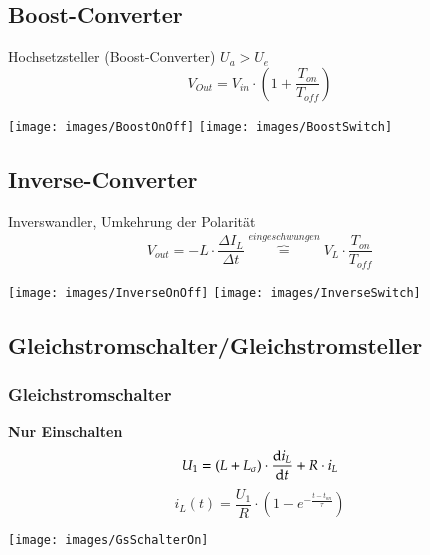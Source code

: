 \subsection{Boost-Converter}
\begin{minipage}{0.75\linewidth}
    Hochsetzsteller (Boost-Converter) $U_a > U_e  $\newline
    \[ V_{Out}=V_{in}\cdot \left(1+\frac{T_{on}}{T_{off}} \right)\]
    
\end{minipage}
\begin{minipage}{0.25\linewidth}
    \vspace{-3cm}
    \texttt{[image: images/BoostOnOff]}
    \texttt{[image: images/BoostSwitch]}
\end{minipage}

\subsection{Inverse-Converter}
\begin{minipage}{0.75\linewidth}
Inverswandler, Umkehrung der Polarität\newline
\[ V_{out}=-L\cdot \frac{\varDelta I_L }{\varDelta t} \overbrace{=}^{eingeschwungen}V_L \cdot \frac{T_{on}}{T_{off}} \]
\end{minipage}
\begin{minipage}{0.25\linewidth}
    \vspace{-3cm}
    \texttt{[image: images/InverseOnOff]}
    \texttt{[image: images/InverseSwitch]}
\end{minipage}

\subsection{Gleichstromschalter/Gleichstromsteller}
\subsubsection{Gleichstromschalter}
\begin{minipage}{0.5\linewidth}
    \textbf{Nur Einschalten}\newline
    \[ U_1=(L + L_{\sigma})\cdot \frac{\mathop{}\!\mathrm{d} i_L}{\mathop{}\!\mathrm{d} t}+R\cdot i_L \]
    \[ i_L(t)=\frac{U_1}{R}\cdot(1-e^{-\frac{t-t_{on}}{\tau}})\]
\end{minipage}
\begin{minipage}{0.4\linewidth}
    \texttt{[image: images/GsSchalterOn]}
\end{minipage}

